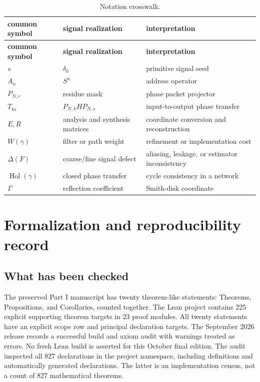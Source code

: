 \documentclass[11pt,letterpaper]{article}
\theoremstyle{plain}
\theoremstyle{plain}
\theoremstyle{plain}
\theoremstyle{definition}
\theoremstyle{definition}
\theoremstyle{definition}
\theoremstyle{definition}
\theoremstyle{remark}
\theoremstyle{remark}
\theoremstyle{remark}
\theoremstyle{remark}
\newcommand{\Gam}{\Gamma}
\begin{document}
\begin{longtable}{L{0.20\textwidth}L{0.33\textwidth}L{0.37\textwidth}}
\caption{Notation crosswalk.}\label{tab:notation}\\
\toprule
\textbf{common symbol}&\textbf{signal realization}&\textbf{interpretation}\\
\midrule
\endfirsthead
\toprule
\textbf{common symbol}&\textbf{signal realization}&\textbf{interpretation}\\
\midrule
\endhead
$s$&$\delta_0$&primitive signal seed\\
$A_n$&$S^n$&address operator\\
$P_{N,r}$&residue mask&phase packet projector\\
$T_{ks}$&$P_{N,k}HP_{N,s}$&input-to-output phase transfer\\
$E,R$&analysis and synthesis matrices&coordinate conversion and reconstruction\\
$W(\gamma)$&filter or path weight&refinement or implementation cost\\
$\Delta(F)$&coarse/fine signal defect&aliasing, leakage, or estimator inconsistency\\
$\operatorname{Hol}(\gamma)$&closed phase transfer&cycle consistency in a network\\
$\Gam$&reflection coefficient&Smith-disk coordinate\\
\bottomrule
\end{longtable}

\clearpage
\section{Formalization and reproducibility record}\label{core:section:21}\label{sec:formalization}

\subsection{What has been checked}

The preserved Part I manuscript has twenty theorem-like statements: Theorems, Propositions, and Corollaries, counted together. The Lean project contains 225 explicit supporting theorem targets in 23 proof modules. All twenty statements have an explicit scope row and principal declaration targets. The September 2026 release records a successful build and axiom audit with warnings treated as errors. No fresh Lean build is asserted for this October final edition. The audit inspected all 827 declarations in the project namespace, including definitions and automatically generated declarations. The latter is an implementation census, not a count of 827 mathematical theorems.
\end{document}
